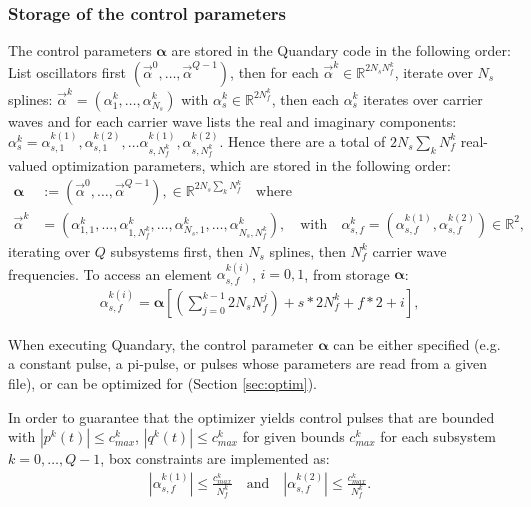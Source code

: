 \documentclass[11pt]{article}
\newcommand{\R}{\mathds{R}}
\newcommand{\bfa}{\boldsymbol{\alpha}}
\newcommand{\bs}[1]{{\boldsymbol{#1}}}
\begin{document}
\subsubsection{Storage of the control parameters}

The control parameters $\bs{\alpha}$ are stored in the Quandary code in the following order: List oscillators first $(\vec{\alpha}^0, \dots, \vec{\alpha}^{Q-1})$, then for each $\vec{\alpha}^k \in
\R^{2N_sN_f^k}$, iterate over $N_s$ splines: $\vec{\alpha}^k =
(\alpha^k_1,\dots, \alpha^k_{N_s})$ with $\alpha^k_s \in \R^{2N_f^k}$, then each
$\alpha^k_s$ iterates over carrier waves and for each carrier wave lists
the real and imaginary components: $\alpha^k_s = \alpha^{k(1)}_{s,1}, \alpha^{k(2)}_{s,1},
\dots \alpha^{k(1)}_{s,N_f^k}, \alpha^{k(2)}_{s,N_f^k}$. Hence there are a total of $2N_s\sum_k N_f^k$ real-valued optimization parameters, which are stored in the following order:
  \begin{align}
    \boldsymbol{\alpha} &:= \left( \vec{\alpha}^0, \dots, \vec{\alpha}^{Q-1} \right), \in
    \mathds{R}^{2N_s\sum_k N_f^k} \quad \text{where}\\
    \vec{\alpha}^k &= \left( \alpha_{1,1}^k,\dots, \alpha_{1,N_f^k}^k, \dots,
    \alpha_{N_s,1}^{k}, \dots, \alpha_{N_s,N_f^k}^k \right), \quad \text{with} \quad
    \alpha_{s,f}^k = \left(\alpha_{s,f}^{k(1)}, \alpha_{s,f}^{k(2)} \right) \in
    \R^2,
  \end{align}
  iterating over $Q$ subsystems first, then $N_s$ splines, then $N_f^k$ carrier wave
  frequencies. To access an element $\alpha_{s,f}^{k(i)}$, $i=0,1$, from storage $\bfa$:
  \begin{align}
    \alpha_{s,f}^{k(i)} = \bfa[ \left(\sum_{j=0}^{k-1} 2N_sN_f^j\right) + s*2N_f^k + f*2 + i ],
  \end{align}

  When executing Quandary, the control parameter $\boldsymbol{\alpha}$ can be either specified (e.g. a constant pulse, a pi-pulse, or pulses whose parameters are read from a given file), or can be optimized for (Section \ref{sec:optim}). 
  
  In order to guarantee that the optimizer yields control pulses that are
  bounded with $|p^k(t)| \leq c^k_{max}$, $|q^k(t)| \leq c^k_{max}$ for given bounds $c^k_{max}$ for each  
  subsystem $k=0,\dots, Q-1$, box constraints are implemented as:
   \begin{align}
     | \alpha_{s,f}^{k(1)}| \leq \frac{c^k_{max}}{N_f^k} \quad \text{and} \quad |
     \alpha_{s,f}^{k(2)} | \leq \frac{c^k_{max}}{N_f^k}.
   \end{align}
\end{document}
